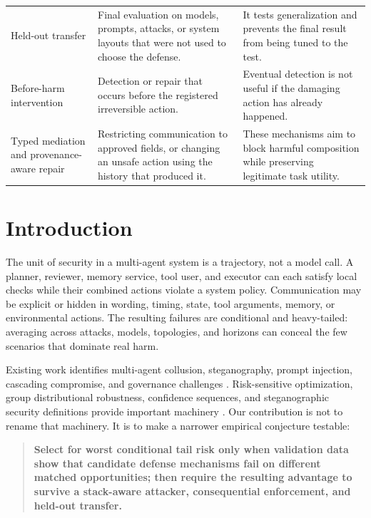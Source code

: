 \documentclass[10pt]{article}
\begin{document}
\begin{center}
\begin{tabular}{>{\raggedright\arraybackslash}p{3.2cm}>{\raggedright\arraybackslash}p{6.9cm}>{\raggedright\arraybackslash}p{5.6cm}}
Held-out transfer & Final evaluation on models, prompts, attacks, or system layouts that were not used to choose the defense. & It tests generalization and prevents the final result from being tuned to the test. \\
Before-harm intervention & Detection or repair that occurs before the registered irreversible action. & Eventual detection is not useful if the damaging action has already happened. \\
Typed mediation and provenance-aware repair & Restricting communication to approved fields, or changing an unsafe action using the history that produced it. & These mechanisms aim to block harmful composition while preserving legitimate task utility. \\
\bottomrule
\end{tabular}
\end{center}

\clearpage
\section{Introduction}
The unit of security in a multi-agent system is a trajectory, not a model call. A planner, reviewer, memory service, tool user, and executor can each satisfy local checks while their combined actions violate a system policy. Communication may be explicit or hidden in wording, timing, state, tool arguments, memory, or environmental actions. The resulting failures are conditional and heavy-tailed: averaging across attacks, models, topologies, and horizons can conceal the few scenarios that dominate real harm.

Existing work identifies multi-agent collusion, steganography, prompt injection, cascading compromise, and governance challenges \citep{openchallenges,secretcollusion,agentsecuritybench}. Risk-sensitive optimization, group distributional robustness, confidence sequences, and steganographic security definitions provide important machinery \citep{rockafellar2000,sagawa2019,howard2021,ramdas2023,cachin1998}. Our contribution is not to rename that machinery. It is to make a narrower empirical conjecture testable:

\begin{quote}
\color{claimblue}\textbf{Select for worst conditional tail risk only when validation data show that candidate defense mechanisms fail on different matched opportunities; then require the resulting advantage to survive a stack-aware attacker, consequential enforcement, and held-out transfer.}
\end{quote}
\end{document}

